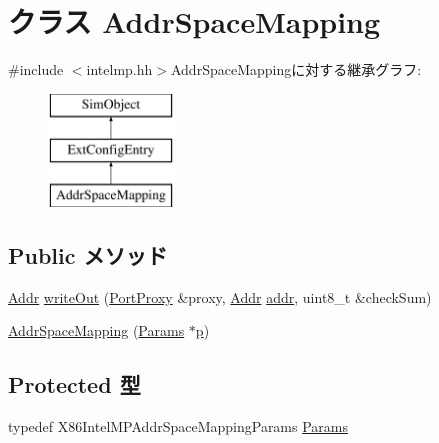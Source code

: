 \hypertarget{classX86ISA_1_1IntelMP_1_1AddrSpaceMapping}{
\section{クラス AddrSpaceMapping}
\label{classX86ISA_1_1IntelMP_1_1AddrSpaceMapping}
}


{\ttfamily \#include $<$intelmp.hh$>$}AddrSpaceMappingに対する継承グラフ:\begin{figure}[H]
\begin{center}
\leavevmode
\includegraphics[height=3cm]{classX86ISA_1_1IntelMP_1_1AddrSpaceMapping}
\end{center}
\end{figure}
\subsection*{Public メソッド}
\begin{DoxyCompactItemize}
\item 
\hyperlink{base_2types_8hh_af1bb03d6a4ee096394a6749f0a169232}{Addr} \hyperlink{classX86ISA_1_1IntelMP_1_1AddrSpaceMapping_a5fffc1006b1f28bd779d83ffbe213b4f}{writeOut} (\hyperlink{classPortProxy}{PortProxy} \&proxy, \hyperlink{base_2types_8hh_af1bb03d6a4ee096394a6749f0a169232}{Addr} \hyperlink{classX86ISA_1_1IntelMP_1_1AddrSpaceMapping_a0e89cf6b9f6cd3125470b1bed2b823df}{addr}, uint8\_\-t \&checkSum)
\item 
\hyperlink{classX86ISA_1_1IntelMP_1_1AddrSpaceMapping_a95ce2e24ec2be9194be028de6be6da59}{AddrSpaceMapping} (\hyperlink{classX86ISA_1_1IntelMP_1_1AddrSpaceMapping_a1ca24332f3ea92d341d5295799303c05}{Params} $\ast$\hyperlink{namespaceX86ISA_af675c1d542a25b96e11164b80809a856}{p})
\end{DoxyCompactItemize}
\subsection*{Protected 型}
\begin{DoxyCompactItemize}
\item 
typedef X86IntelMPAddrSpaceMappingParams \hyperlink{classX86ISA_1_1IntelMP_1_1AddrSpaceMapping_a1ca24332f3ea92d341d5295799303c05}{Params}
\end{DoxyCompactItemize}

